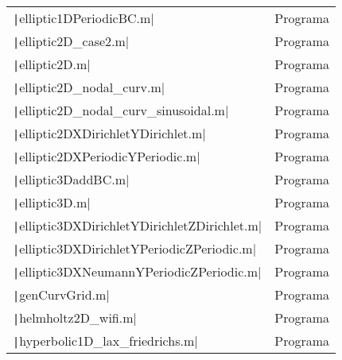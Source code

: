 \begin{table}[ht!]
\begin{tabular}{|l|l|}
		\texttt|elliptic1DPeriodicBC.m|                                                                                  & Programa    \\
		\texttt|elliptic2D_case2.m|                                                                                      & Programa    \\
		\texttt|elliptic2D.m|                                                                                            & Programa    \\
		\texttt|elliptic2D_nodal_curv.m|                                                                                 & Programa    \\
		\texttt|elliptic2D_nodal_curv_sinusoidal.m|                                                                      & Programa    \\
		\texttt|elliptic2DXDirichletYDirichlet.m|                                                                        & Programa    \\
		\texttt|elliptic2DXPeriodicYPeriodic.m|                                                                          & Programa    \\
		\texttt|elliptic3DaddBC.m|                                                                                       & Programa    \\
		\texttt|elliptic3D.m|                                                                                            & Programa    \\
		\texttt|elliptic3DXDirichletYDirichletZDirichlet.m|                                                              & Programa    \\
		\texttt|elliptic3DXDirichletYPeriodicZPeriodic.m|                                                                & Programa    \\
		\texttt|elliptic3DXNeumannYPeriodicZPeriodic.m|                                                                  & Programa    \\
		\texttt|genCurvGrid.m|                                                                                           & Programa    \\
		\texttt|helmholtz2D_wifi.m|                                                                                      & Programa    \\
		\texttt|hyperbolic1D_lax_friedrichs.m|                                                                           & Programa    \\

\end{tabular}
\end{table}
